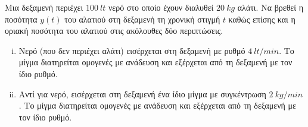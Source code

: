 \begin{problem}
  Μια δεξαμενή περιέχει $ \SI{100}{lt} $ νερό στο οποίο έχουν διαλυθεί 
  $ \SI{20}{kg} $ αλάτι. Να βρεθεί η ποσότητα $ y(t) $ του αλατιού στη δεξαμενή 
  τη χρονική στιγμή $t$ καθώς επίσης και η οριακή ποσότητα του αλατιού στις ακόλουθες 
  δύο περιπτώσεις.
  \begin{enumerate}[i)]
    \item Νερό (που δεν περιέχει αλάτι) εισέρχεται στη δεξαμενή με ρυθμό 
      $ \SI{4}{lt/min} $. Το μίγμα διατηρείται ομογενές με ανάδευση και εξέρχεται από τη
      δεξαμενή με τον ίδιο ρυθμό.
    \item Αντί για νερό, εισέρχεται στη δεξαμενή ένα ίδιο μίγμα με συγκέντρωση 
      $ \SI{2}{kg/min} $. Το μίγμα διατηρείται ομογενές με ανάδευση και εξέρχεται από τη
      δεξαμενή με τον ίδιο ρυθμό.   
  \end{enumerate}
\end{problem}

